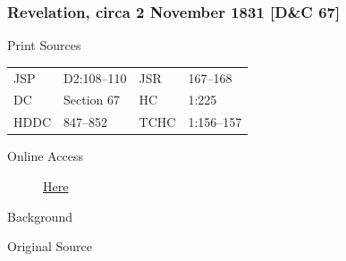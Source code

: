 {		%
		\subsubsection{Revelation, circa 2 November 1831 [D\&C 67]}
			\label{EMS-1831-JS-CIR-2-NOV-1831}
		
			\begin{description}
				\item[Print Sources]
			\end{description}

				\begin{tabular}{p{0.5in}p{1in}p{0.5in}p{1in}}
				JSP	 	& D2:108--110	& JSR 		& 167--168 \\
				DC	 	& Section 67 	& HC 		& 1:225 \\
				HDDC 	& 847--852		& TCHC 		& 1:156--157 \\
				\end{tabular}
			
			\begin{description}
				\item[Online Access] \href{https://www.josephsmithpapers.org/paper-summary/revelation-circa-2-november-1831-dc-67/1}{Here}
			\end{description}
			
			\begin{description}
				\item[Background]
			\end{description}
			
			
			\begin{description}
				\item[Original Source]
			\end{description}
			
			
}
